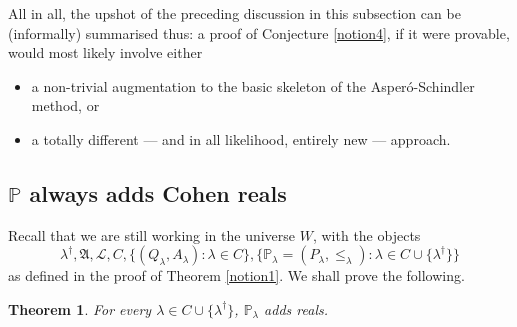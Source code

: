 \documentclass[12pt, twoside]{memoir}
\numberwithin{equation}{section}
\newtheorem{thm}{Theorem}[section]
\theoremstyle{definition}
\theoremstyle{remark}
\theoremstyle{definition}
\theoremstyle{definition}
\theoremstyle{definition}
\theoremstyle{remark}
\begin{document}
All in all, the upshot of the preceding discussion in this subsection can be (informally) summarised thus: a proof of Conjecture \ref{notion4}, if it were provable, would most likely involve either
\begin{itemize}
    \item a non-trivial augmentation to the basic skeleton of the Asper\'{o}-Schindler method, or 
    \item a totally different --- and in all likelihood, entirely new --- approach.
\end{itemize}

\subsection{\texorpdfstring{$\mathbb{P}$}{P} always adds Cohen reals}

Recall that we are still working in the universe $W$, with the objects
\begin{equation*}
    \lambda^{\dagger}, \mathfrak{A}, \mathcal{L}, C, \{(Q_{\lambda}, A_{\lambda}) : \lambda \in C\}, \{\mathbb{P}_{\lambda} = (P_{\lambda}, \leq_{\lambda}) : \lambda \in C \cup \{\lambda^{\dagger}\}\}
\end{equation*}
as defined in the proof of Theorem \ref{notion1}. We shall prove the following.

\begin{thm}\label{thm747}
For every $\lambda \in C \cup \{\lambda^{\dagger}\}$, $\mathbb{P}_{\lambda}$ adds reals.
\end{thm}
\end{document}
